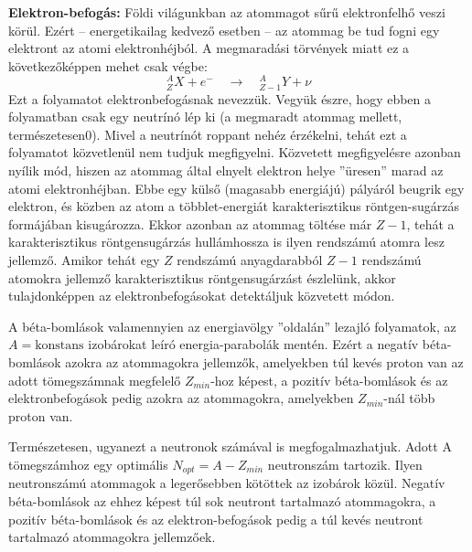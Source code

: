 \documentclass[../main.tex]{subfiles}
\begin{document}
\textbf{Elektron-befogás:} Földi világunkban az atommagot sűrű elektronfelhő veszi körül.
Ezért – energetikailag kedvező esetben – az atommag be tud fogni egy elektront az atomi
elektronhéjból. A megmaradási törvények miatt ez a következőképpen mehet csak végbe:
\begin{equation}
    ^A_Z X + e^- \quad \rightarrow \quad ^A_{Z-1} Y + \nu
\end{equation}
Ezt a folyamatot elektronbefogásnak nevezzük. Vegyük észre, hogy ebben a folyamatban csak egy neutrínó lép ki (a megmaradt atommag mellett, természetesen0). Mivel a
neutrínót roppant nehéz érzékelni, tehát ezt a folyamatot közvetlenül nem tudjuk megfigyelni. Közvetett megfigyelésre azonban nyílik mód, hiszen az atommag által elnyelt
elektron helye ”üresen” marad az atomi elektronhéjban. Ebbe egy külső (magasabb
energiájú) pályáról beugrik egy elektron, és közben az atom a többlet-energiát karakterisztikus röntgen-sugárzás formájában kisugározza. Ekkor azonban az atommag töltése
már $Z - 1$, tehát a karakterisztikus röntgensugárzás hullámhossza is ilyen rendszámú
atomra lesz jellemző. Amikor tehát egy $Z$ rendszámú anyagdarabból $Z - 1$ rendszámú
atomokra jellemző karakterisztikus röntgensugárzást észlelünk, akkor tulajdonképpen az
elektronbefogásokat detektáljuk közvetett módon.

A béta-bomlások valamennyien az energiavölgy ”oldalán” lezajló folyamatok, az $A = \text{konstans}$ izobárokat leíró energia-parabolák mentén. Ezért a
negatív béta-bomlások azokra az atommagokra jellemzők, amelyekben túl kevés proton
van az adott tömegszámnak megfelelő $Z_{min}$-hoz képest, a pozitív béta-bomlások és az
elektronbefogások pedig azokra az atommagokra, amelyekben $Z_{min}$-nál több proton van.

Természetesen, ugyanezt a neutronok számával is megfogalmazhatjuk. Adott A tömegszámhoz egy optimális $N_{opt} = A - Z_{min}$ neutronszám tartozik. Ilyen neutronszámú
atommagok a legerősebben kötöttek az izobárok közül. Negatív béta-bomlások az ehhez képest túl sok neutront tartalmazó atommagokra, a pozitív béta-bomlások és az
elektron-befogások pedig a túl kevés neutront tartalmazó atommagokra jellemzőek.
\end{document}
